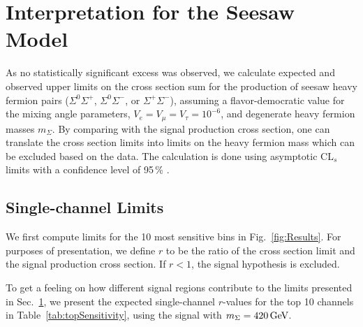 \section{Interpretation for the Seesaw Model}
\label{sec:Interpretation}
\label{sec:Interpretation/Seesaw}

As no statistically significant excess was observed, we calculate expected and observed upper limits on the cross section sum for the production of seesaw heavy fermion pairs ($\Sigma^0\Sigma^+$, $\Sigma^0\Sigma^-$, or $\Sigma^+\Sigma^-$), assuming a flavor-democratic value for the mixing angle parameters, $V_e = V_\mu = V_\tau = 10^{-6}$, and degenerate heavy fermion masses $m_\Sigma$.
By comparing with the signal production cross section, one can translate the cross section limits into limits on the heavy fermion mass which can be excluded based on the data.
The calculation is done using asymptotic CL$_s$ limits with a confidence level of 95\,\% \cite{Junk:1999kv,Read:2000ru,Read:2002hq}.

\subsection{Single-channel Limits}
\label{sec:Results/singleChannel}

We first compute limits for the 10 most sensitive bins in Fig.~\ref{fig:Results}. For purposes of presentation, we define $r$ to be the ratio of the cross section limit and the signal production cross section. If $r < 1$, the signal hypothesis is excluded.

To get a feeling on how different signal regions contribute to the limits presented in Sec.~\ref{sec:Interpretation}, we present the expected single-channel $r$-values for the top 10 channels in Table~\ref{tab:topSensitivity}, using the signal with $m_\Sigma = 420\,\text{Ge\hspace{-.08em}V}$.

